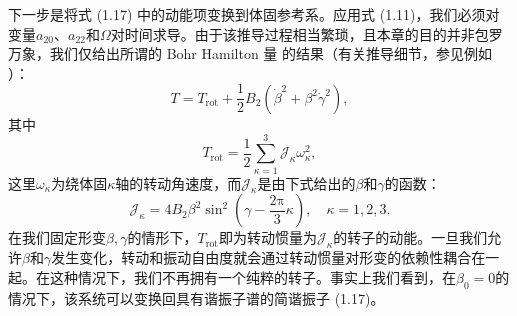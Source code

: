 下一步是将式 (1.17) 中的动能项变换到体固参考系。应用式 (1.11)，我们必须对变量$a_{20}$、$a_{22}$和$\Omega$对时间求导。由于该推导过程相当繁琐，且本章的目的并非包罗万象，我们仅给出所谓的
Bohr Hamilton 量 \cite{Bo52} 的结果（有关推导细节，参见例如 \cite[第 I 卷第 5 章]{EG70}）：
\begin{equation}
T=T_{\text{rot}}+\frac{1}{2}B_{2}(\dot{\beta}^{2}+\beta^{2}\dot{\gamma}^{2}),\label{eq:1.47}
\end{equation}
其中
\begin{equation}
T_{\text{rot}}=\frac{1}{2}\sum^{3}_{\kappa=1}\mathcal{J}_{\kappa}\omega^{2}_{\kappa},
\end{equation}
这里$\omega_{\kappa}$为绕体固$\kappa$轴的转动角速度，而$\mathcal{J}_{\kappa}$是由下式给出的$\beta$和$\gamma$的函数：
\begin{equation}
\mathcal{J}_{\kappa}=4B_{2}\beta^{2}\sin^{2}\left(\gamma-\frac{2\mathrm{\pi}}{3}\kappa\right),\quad\kappa=1,2,3.\label{eq:1.48}
\end{equation}
在我们固定形变$\beta,\gamma$的情形下，$T_{\text{rot}}$即为转动惯量为$\mathcal{J}_{\kappa}$的转子的动能。一旦我们允许$\beta$和$\gamma$发生变化，转动和振动自由度就会通过转动惯量对形变的依赖性耦合在一起。在这种情况下，我们不再拥有一个纯粹的转子。事实上我们看到，在$\beta_{0}=0$的情况下，该系统可以变换回具有谐振子谱的简谐振子
(1.17)。

